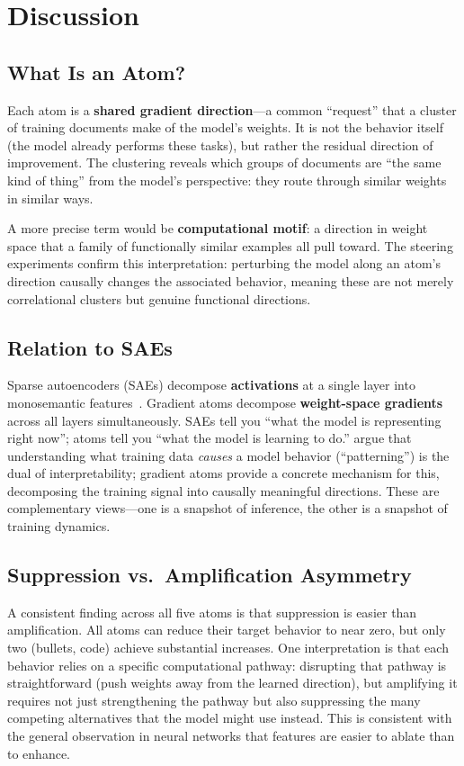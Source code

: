 \documentclass{article} %
\begin{document}
\section{Discussion}

\subsection{What Is an Atom?}

Each atom is a \textbf{shared gradient direction}---a common ``request'' that a cluster of training documents make of the model's weights. It is not the behavior itself (the model already performs these tasks), but rather the residual direction of improvement. The clustering reveals which groups of documents are ``the same kind of thing'' from the model's perspective: they route through similar weights in similar ways.

A more precise term would be \textbf{computational motif}: a direction in weight space that a family of functionally similar examples all pull toward. The steering experiments confirm this interpretation: perturbing the model along an atom's direction causally changes the associated behavior, meaning these are not merely correlational clusters but genuine functional directions.

\subsection{Relation to SAEs}

Sparse autoencoders (SAEs) decompose \textbf{activations} at a single layer into monosemantic features~\citep{nanda2023progress}. Gradient atoms decompose \textbf{weight-space gradients} across all layers simultaneously. SAEs tell you ``what the model is representing right now''; atoms tell you ``what the model is learning to do.'' \citet{wang2026patterning} argue that understanding what training data \emph{causes} a model behavior (``patterning'') is the dual of interpretability; gradient atoms provide a concrete mechanism for this, decomposing the training signal into causally meaningful directions. These are complementary views---one is a snapshot of inference, the other is a snapshot of training dynamics.

\subsection{Suppression vs.\ Amplification Asymmetry}

A consistent finding across all five atoms is that suppression is easier than amplification. All atoms can reduce their target behavior to near zero, but only two (bullets, code) achieve substantial increases. One interpretation is that each behavior relies on a specific computational pathway: disrupting that pathway is straightforward (push weights away from the learned direction), but amplifying it requires not just strengthening the pathway but also suppressing the many competing alternatives that the model might use instead. This is consistent with the general observation in neural networks that features are easier to ablate than to enhance.
\end{document}
